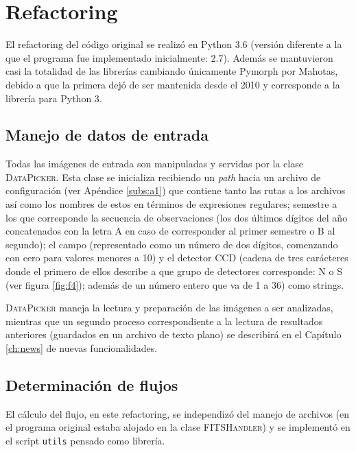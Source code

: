 \chapter{Refactoring}
\label{ch:refactoring}
El refactoring del c\'odigo original se realiz\'o en Python 3.6 (versi\'on diferente a la que el programa fue implementado inicialmente: 2.7). Adem\'as se mantuvieron casi la totalidad de las librer\'ias cambiando \'unicamente Pymorph por Mahotas, debido a que la primera dej\'o de ser mantenida desde el 2010 y corresponde a la librer\'ia para Python 3.   

\section{Manejo de datos de entrada}
Todas las im\'agenes de entrada son manipuladas y servidas por la clase \textsc{DataPicker}. Esta clase se inicializa recibiendo un \textit{path} hacia un archivo de configuraci\'on (ver Ap\'endice \ref{subs:a1}) que contiene tanto las rutas a los archivos as\'i como los nombres de estos en t\'erminos de expresiones regulares; semestre a los que corresponde la secuencia de observaciones (los dos \'ultimos d\'igitos del a\~no concatenados con la letra A en caso de corresponder al primer semestre o B al segundo); el campo (representado como un n\'umero de dos d\'igitos, comenzando con cero para valores menores a 10) y el detector CCD (cadena de tres car\'acteres donde el primero de ellos describe a que grupo de detectores corresponde: N o S (ver figura \ref{fig:f4}); adem\'as de un n\'umero entero que va de 1 a 36) como strings. 
\bigskip

\textsc{DataPicker} maneja  la lectura y preparaci\'on de las im\'agenes a ser analizadas, mientras que un segundo proceso correspondiente a la lectura de resultados anteriores (guardados en un archivo de texto plano) se describir\'a en el Cap\'itulo \ref{ch:news} de nuevas funcionalidades. 
\bigskip
  

\section{Determinaci\'on de flujos}
El c\'alculo del flujo, en este refactoring, se independiz\'o del manejo de archivos (en el programa original estaba alojado en la clase \textsc{FITSHandler}) y se implement\'o en el script \texttt{utils} pensado como librer\'ia.
\bigskip

